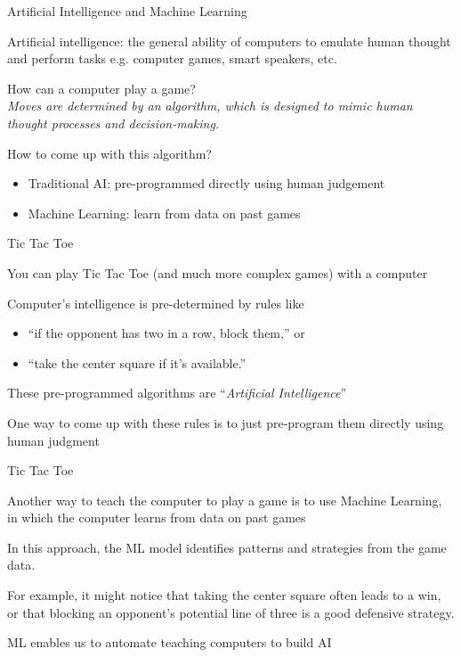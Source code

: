 \documentclass{./../div_teaching_slides}
\begin{document}
\begin{frame}{Artificial Intelligence and Machine Learning}
\begin{witemize}
  \item Artificial intelligence: the general ability of computers to emulate human thought and perform tasks e.g. computer games, smart speakers, etc.
  \item How can a computer play a game? \\ \pause
  \textit{Moves are determined by an algorithm, which is designed to mimic human thought processes and decision-making.}
  \item How to come up with this algorithm? \vspace{0.25em}
  \begin{itemize}
  \item Traditional AI: pre-programmed directly using human judgement
  \item Machine Learning: learn from data on past games
\end{itemize}

\end{witemize}
\end{frame}

\begin{frame}{Tic Tac Toe}
\begin{witemize}
  \item You can play Tic Tac Toe (and much more complex games) with a computer
  \item Computer's intelligence is pre-determined by rules like \vspace{0.25em}
  \begin{itemize}
  \item ``if the opponent has two in a row, block them,'' or 
  \item ``take the center square if it's available.''
\end{itemize}
\item These pre-programmed algorithms are ``\textit{Artificial Intelligence}''
\item One way to come up with these rules is to just pre-program them directly using human judgment
\end{witemize}
\end{frame}

\begin{frame}{Tic Tac Toe}
\begin{witemize}
\item Another way to teach the computer to play a game is to use Machine Learning, in which the computer learns from data on past games 
\item In this approach, the ML model identifies patterns and strategies from the game data. 
\item For example, it might notice that taking the center square often leads to a win, or that blocking an opponent's potential line of three is a good defensive strategy.
\item ML enables us to automate teaching computers to build AI 
\end{witemize}
\end{frame}
\end{document}
